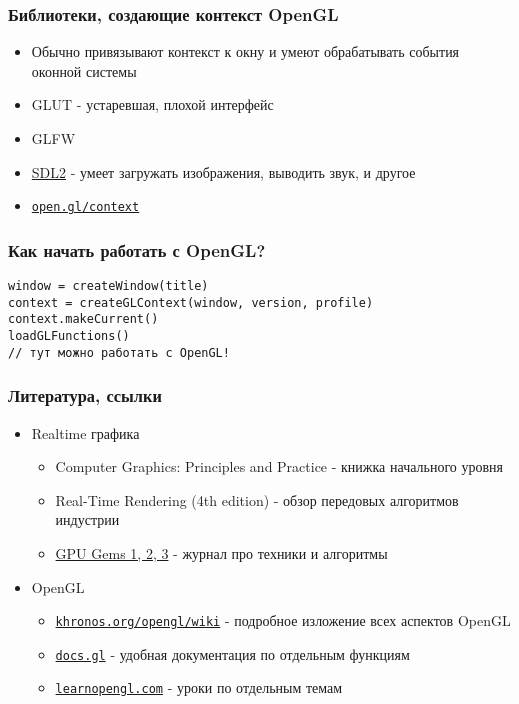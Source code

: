 \documentclass{beamer}
\begin{document}
\begin{frame}
\frametitle{Библиотеки, создающие контекст OpenGL}
\begin{itemize}
\item Обычно привязывают контекст к окну и умеют обрабатывать события оконной системы
\item GLUT - устаревшая, плохой интерфейс
\item GLFW
\item {\color{blue}\underline{SDL2}} - умеет загружать изображения, выводить звук, и другое
\item \href{https://open.gl/context}{\nolinkurl{open.gl/context}}
\end{itemize}
\end{frame}

\begin{frame}[fragile]
\frametitle{Как начать работать с OpenGL?}
\begin{verbatim}
window = createWindow(title)
context = createGLContext(window, version, profile)
context.makeCurrent()
loadGLFunctions()
// тут можно работать с OpenGL!
\end{verbatim}
\end{frame}

\begin{frame}
\frametitle{Литература, ссылки}
\begin{itemize}
\item Realtime графика
\begin{itemize}
\item Computer Graphics: Principles and Practice - книжка начального уровня
\item Real-Time Rendering (4th edition) - обзор передовых алгоритмов индустрии
\item \href{https://developer.nvidia.com/gpugems}{GPU Gems 1, 2, 3} - журнал про техники и алгоритмы
\end{itemize}
\item OpenGL
\begin{itemize}
\item \href{https://khronos.org/opengl/wiki}{\nolinkurl{khronos.org/opengl/wiki}} - подробное изложение всех аспектов OpenGL
\item \href{http://docs.gl}{\nolinkurl{docs.gl}} - удобная документация по отдельным функциям
\item \href{https://learnopengl.com}{\nolinkurl{learnopengl.com}} - уроки по отдельным темам
\end{itemize}
\end{itemize}
\end{frame}
\end{document}
